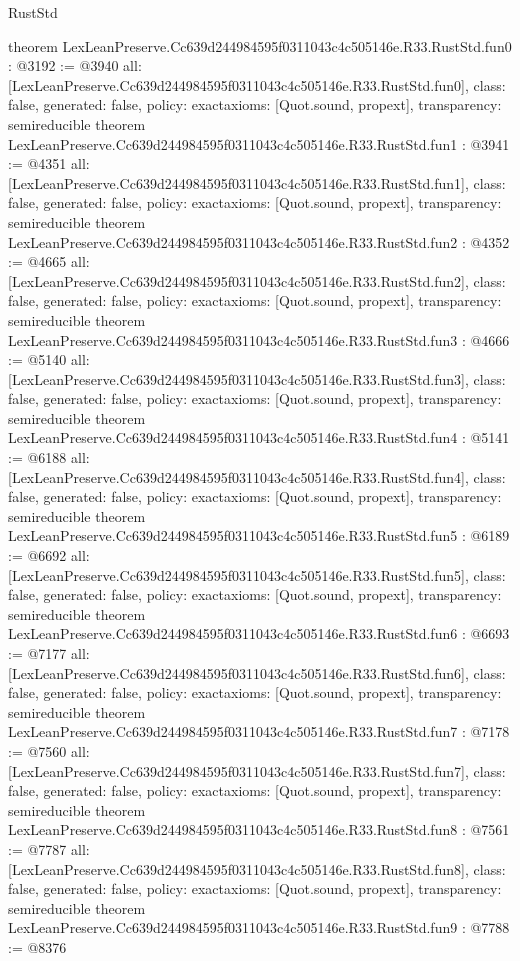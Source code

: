 \begin{lexlean}{RustStd}
\begin{coremodule}
{}
theorem LexLeanPreserve.Cc639d244984595f0311043c4c505146e.R33.RustStd.fun0 : @3192 := @3940 {
  all: [LexLeanPreserve.Cc639d244984595f0311043c4c505146e.R33.RustStd.fun0],
  class: false,
  generated: false,
  policy: exact{axioms: [Quot.sound, propext]},
  transparency: semireducible
}
theorem LexLeanPreserve.Cc639d244984595f0311043c4c505146e.R33.RustStd.fun1 : @3941 := @4351 {
  all: [LexLeanPreserve.Cc639d244984595f0311043c4c505146e.R33.RustStd.fun1],
  class: false,
  generated: false,
  policy: exact{axioms: [Quot.sound, propext]},
  transparency: semireducible
}
theorem LexLeanPreserve.Cc639d244984595f0311043c4c505146e.R33.RustStd.fun2 : @4352 := @4665 {
  all: [LexLeanPreserve.Cc639d244984595f0311043c4c505146e.R33.RustStd.fun2],
  class: false,
  generated: false,
  policy: exact{axioms: [Quot.sound, propext]},
  transparency: semireducible
}
theorem LexLeanPreserve.Cc639d244984595f0311043c4c505146e.R33.RustStd.fun3 : @4666 := @5140 {
  all: [LexLeanPreserve.Cc639d244984595f0311043c4c505146e.R33.RustStd.fun3],
  class: false,
  generated: false,
  policy: exact{axioms: [Quot.sound, propext]},
  transparency: semireducible
}
theorem LexLeanPreserve.Cc639d244984595f0311043c4c505146e.R33.RustStd.fun4 : @5141 := @6188 {
  all: [LexLeanPreserve.Cc639d244984595f0311043c4c505146e.R33.RustStd.fun4],
  class: false,
  generated: false,
  policy: exact{axioms: [Quot.sound, propext]},
  transparency: semireducible
}
theorem LexLeanPreserve.Cc639d244984595f0311043c4c505146e.R33.RustStd.fun5 : @6189 := @6692 {
  all: [LexLeanPreserve.Cc639d244984595f0311043c4c505146e.R33.RustStd.fun5],
  class: false,
  generated: false,
  policy: exact{axioms: [Quot.sound, propext]},
  transparency: semireducible
}
theorem LexLeanPreserve.Cc639d244984595f0311043c4c505146e.R33.RustStd.fun6 : @6693 := @7177 {
  all: [LexLeanPreserve.Cc639d244984595f0311043c4c505146e.R33.RustStd.fun6],
  class: false,
  generated: false,
  policy: exact{axioms: [Quot.sound, propext]},
  transparency: semireducible
}
theorem LexLeanPreserve.Cc639d244984595f0311043c4c505146e.R33.RustStd.fun7 : @7178 := @7560 {
  all: [LexLeanPreserve.Cc639d244984595f0311043c4c505146e.R33.RustStd.fun7],
  class: false,
  generated: false,
  policy: exact{axioms: [Quot.sound, propext]},
  transparency: semireducible
}
theorem LexLeanPreserve.Cc639d244984595f0311043c4c505146e.R33.RustStd.fun8 : @7561 := @7787 {
  all: [LexLeanPreserve.Cc639d244984595f0311043c4c505146e.R33.RustStd.fun8],
  class: false,
  generated: false,
  policy: exact{axioms: [Quot.sound, propext]},
  transparency: semireducible
}
theorem LexLeanPreserve.Cc639d244984595f0311043c4c505146e.R33.RustStd.fun9 : @7788 := @8376 {
}
\end{coremodule}
\end{lexlean}
